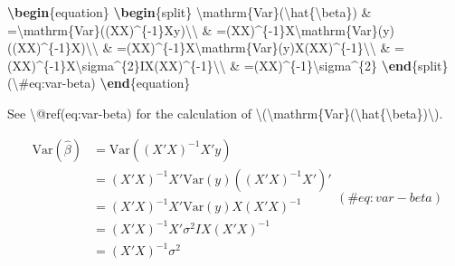\documentclass[
  letterpaper,
  oneside]{book}
\newenvironment{Shaded}{\begin{snugshade}}{\end{snugshade}}
\newcommand{\ExtensionTok}[1]{\textcolor[rgb]{0.00,0.23,0.31}{#1}}
\newcommand{\FunctionTok}[1]{\textcolor[rgb]{0.28,0.35,0.67}{#1}}
\newcommand{\KeywordTok}[1]{\textcolor[rgb]{0.00,0.23,0.31}{\textbf{#1}}}
\newcommand{\NormalTok}[1]{\textcolor[rgb]{0.00,0.23,0.31}{#1}}
\newcommand{\SpecialCharTok}[1]{\textcolor[rgb]{0.37,0.37,0.37}{#1}}
\newcommand{\SpecialStringTok}[1]{\textcolor[rgb]{0.13,0.47,0.30}{#1}}
\numberwithin{equation}{section}
\numberwithin{figure}{section}
\theoremstyle{break}
\theoremstyle{plain}
\theoremstyle{remark}
\begin{document}
\begin{Shaded}
\begin{Highlighting}[]
\KeywordTok{\textbackslash{}begin}\NormalTok{\{}\ExtensionTok{equation}\NormalTok{\}}\SpecialStringTok{ }
\KeywordTok{\textbackslash{}begin}\NormalTok{\{}\ExtensionTok{split}\NormalTok{\}}
\SpecialCharTok{\textbackslash{}mathrm}\SpecialStringTok{\{Var\}(}\SpecialCharTok{\textbackslash{}hat}\SpecialStringTok{\{}\SpecialCharTok{\textbackslash{}beta}\SpecialStringTok{\}) \& =}\SpecialCharTok{\textbackslash{}mathrm}\SpecialStringTok{\{Var\}((X\textquotesingle{}X)\^{}\{{-}1\}X\textquotesingle{}y)}\SpecialCharTok{\textbackslash{}\textbackslash{}}
\SpecialStringTok{ \& =(X\textquotesingle{}X)\^{}\{{-}1\}X\textquotesingle{}}\SpecialCharTok{\textbackslash{}mathrm}\SpecialStringTok{\{Var\}(y)((X\textquotesingle{}X)\^{}\{{-}1\}X\textquotesingle{})\textquotesingle{}}\SpecialCharTok{\textbackslash{}\textbackslash{}}
\SpecialStringTok{ \& =(X\textquotesingle{}X)\^{}\{{-}1\}X\textquotesingle{}}\SpecialCharTok{\textbackslash{}mathrm}\SpecialStringTok{\{Var\}(y)X(X\textquotesingle{}X)\^{}\{{-}1\}}\SpecialCharTok{\textbackslash{}\textbackslash{}}
\SpecialStringTok{ \& =(X\textquotesingle{}X)\^{}\{{-}1\}X\textquotesingle{}}\SpecialCharTok{\textbackslash{}sigma}\SpecialStringTok{\^{}\{2\}IX(X\textquotesingle{}X)\^{}\{{-}1\}}\SpecialCharTok{\textbackslash{}\textbackslash{}}
\SpecialStringTok{ \& =(X\textquotesingle{}X)\^{}\{{-}1\}}\SpecialCharTok{\textbackslash{}sigma}\SpecialStringTok{\^{}\{2\}}
\KeywordTok{\textbackslash{}end}\NormalTok{\{}\ExtensionTok{split}\NormalTok{\}}
\SpecialStringTok{(}\SpecialCharTok{\textbackslash{}\#}\SpecialStringTok{eq:var{-}beta)}
\KeywordTok{\textbackslash{}end}\NormalTok{\{}\ExtensionTok{equation}\NormalTok{\} }

\NormalTok{See }\FunctionTok{\textbackslash{}@ref}\NormalTok{(eq:var{-}beta) for the calculation of }\SpecialStringTok{\textbackslash{}(}\SpecialCharTok{\textbackslash{}mathrm}\SpecialStringTok{\{Var\}(}\SpecialCharTok{\textbackslash{}hat}\SpecialStringTok{\{}\SpecialCharTok{\textbackslash{}beta}\SpecialStringTok{\})\textbackslash{})}\NormalTok{.}
\end{Highlighting}
\end{Shaded}

\begin{equation} 
\begin{split}
\mathrm{Var}(\hat{\beta}) & =\mathrm{Var}((X'X)^{-1}X'y)\\
 & =(X'X)^{-1}X'\mathrm{Var}(y)((X'X)^{-1}X')'\\
 & =(X'X)^{-1}X'\mathrm{Var}(y)X(X'X)^{-1}\\
 & =(X'X)^{-1}X'\sigma^{2}IX(X'X)^{-1}\\
 & =(X'X)^{-1}\sigma^{2}
\end{split}
(\#eq:var-beta)
\end{equation}
\end{document}
